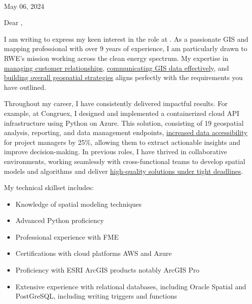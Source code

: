 \documentclass[letterpaper]{article}
\newcommand{\impt}[1]{\uline{#1}}
\begin{document}
\large
\textbf{\JobCompany} \\

\null\hfill May 06, 2024

Dear \JobManagerShort,

I am writing to express my keen interest in the
\impt{\JobTitle} role at {\JobCompany}.
As a passionate GIS and mapping professional with over 9 years of
experience, I am particularly drawn to RWE's mission working across the clean energy spectrum.
My expertise in \impt{managing customer relationships},
\impt{communicating GIS data effectively},
and \impt{building overall geospatial strategies}
aligns perfectly with the requirements you have outlined.

Throughout my career, I have consistently delivered impactful results.
For example, at Congruex, I designed and implemented a containerized cloud API
infrastructure using Python on Azure.
This solution, consisting of 19 geospatial analysis, reporting, and data management endpoints, 
\impt{increased data accessibility} for project managers by 25\%, allowing them to extract actionable
insights and improve decision-making.
In previous roles, I have thrived in collaborative environments, working seamlessly with cross-functional teams to
develop spatial models and algorithms and
deliver \impt{high-quality solutions under tight deadlines}.

\iffalse
- Collaborate with cross-functional teams,
- suitability analysis
· Organize and maintain geospatial datasets
- Design web-based and static GIS products to communicate GIS data effectively to other teams and stakeholders
· Collaborate with cross-functional teams
- Knowledge of spatial modeling techniques
- ability to manage customer relationships
- leadership and communication, and ability to meet deadlines
- Strong organization skills and ability to coordinate multiple tasks and deliverables
- build relationships, and effectively communicate
\fi

My technical skillset includes:

\vspace{-12pt}
\begin{itemize} \itemsep 0pt
\item Knowledge of spatial modeling techniques
\item Advanced Python proficiency
\item Professional experience with FME
\item Certifications with cloud platforms AWS and Azure
\item Proficiency with ESRI ArcGIS products notably ArcGIS Pro
\item Extensive experience with relational databases, including Oracle Spatial and PostGreSQL,
    including writing triggers and functions
\end{itemize}
\end{document}
